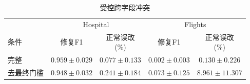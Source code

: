 \begin{table}[tb]\centering\fontsize{7.5}{9}\selectfont\setlength{\tabcolsep}{1pt}
\caption{受控跨字段冲突}
\label{tab:semantic-all}
\begin{tabular}{lcccc}\toprule
&\multicolumn{2}{c}{Hospital}&\multicolumn{2}{c}{Flights}\\
条件 & 修复F1 & \makecell{正常误改\\(\%)} & 修复F1 & \makecell{正常误改\\(\%)}\\\midrule
完整 & $0.959\pm0.029$ & $0.077\pm0.133$ & $0.002\pm0.003$ & $0.130\pm0.226$ \\
去最终门槛 & $0.948\pm0.032$ & $0.241\pm0.184$ & $0.073\pm0.125$ & $8.961\pm11.307$ \\
\bottomrule\end{tabular}
\end{table}
